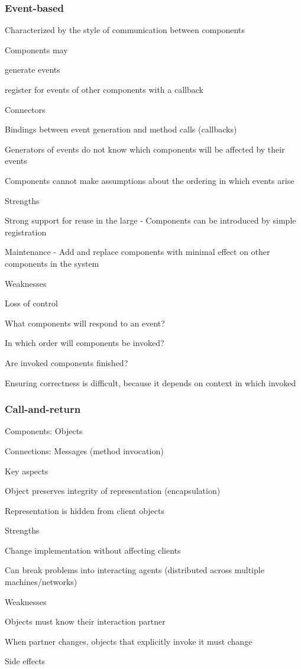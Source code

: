 \subsubsection{Event-based}
\enumstart
	\item Characterized by the style of communication between components
	\item Components may
	\enumstart
		\item generate events
		\item register for events of other components with a callback
	\enumend
	\item Connectors
	\enumstart
		\item Bindings between event generation and method calls (callbacks)
	\enumend
	\item Generators of events do not know  which  components will be affected by their events
	\item Components cannot make assumptions about the ordering in which events arise
	\item Strengths
	\enumstart
		\item Strong support for reuse in the large - Components can be introduced by simple registration
		\item Maintenance - Add and replace components with minimal effect on other components in the system
	\enumend
	\item Weaknesses
	\enumstart
		\item Loss of control
		\enumstart
			 \item What components will respond to an event?
			 \item In which order will components be invoked?
			 \item Are invoked components finished?
		\enumend
		\item Ensuring correctness is difficult, because it depends on context in which invoked
	\enumend
\enumend

\subsubsection{Call-and-return}
\enumstart
	\item Components: Objects
	\item Connections: Messages (method invocation)
	\item Key aspects
	\enumstart
		\item Object preserves integrity of representation (encapsulation)
		\item Representation is hidden from client objects
	\enumend
	\item Strengths
	\enumstart
		\item Change implementation without affecting clients
		\item Can break problems into interacting agents (distributed across multiple machines/networks)
	\enumend
	\item Weaknesses
	\enumstart
		\item Objects must know their interaction partner
		\item When partner changes, objects that explicitly invoke it must change
		\item Side effects
	\enumend
\enumend
